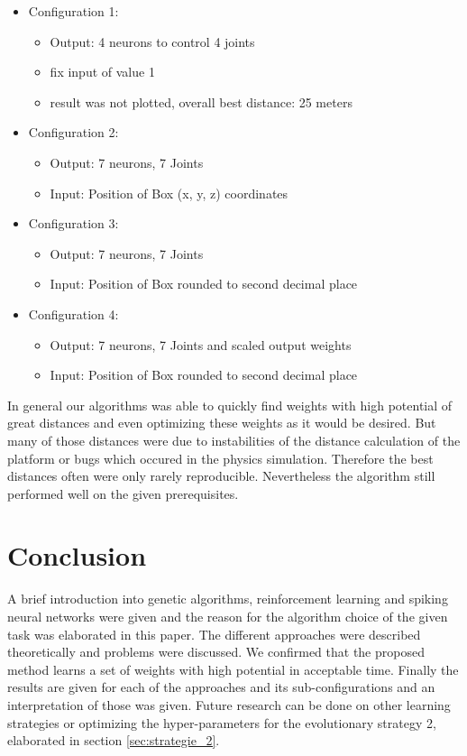 \begin{itemize}
\item Configuration 1: 
\begin{itemize}
\item Output: 4 neurons to control 4 joints
\item fix input of value 1
\item result was not plotted, overall best distance: 25 meters
\end{itemize}
\item Configuration 2: 
\begin{itemize}
\item Output: 7 neurons, 7 Joints 
\item Input: Position of Box (x, y, z) coordinates
\end{itemize}
\item Configuration 3: 
\begin{itemize}
\item Output: 7 neurons, 7 Joints 
\item Input: Position of Box rounded to second decimal place
\end{itemize}
\item Configuration 4: 
\begin{itemize}
\item Output: 7 neurons, 7 Joints and scaled output weights 
\item Input: Position of Box rounded to second decimal place
\end{itemize}
\end{itemize}

In general our algorithms was able to quickly find weights with high potential of great distances and even optimizing these weights as it would be desired. But many of those distances were due to instabilities of the distance calculation of the platform or bugs which occured in the physics simulation. Therefore the best distances often were only rarely reproducible. Nevertheless the algorithm still performed well on the given prerequisites.


\section{Conclusion}
A brief introduction into genetic algorithms, reinforcement learning and spiking neural networks were given and the reason for the algorithm choice of the given task was elaborated in this paper. The different approaches were described theoretically and problems were discussed. We confirmed that the proposed method learns a set of weights with high potential in acceptable time. Finally the results are given for each of the approaches and its sub-configurations and an interpretation of those was given.
Future research can be done on other learning strategies or optimizing the hyper-parameters for the evolutionary strategy 2, elaborated in section \ref{sec:strategie_2}.